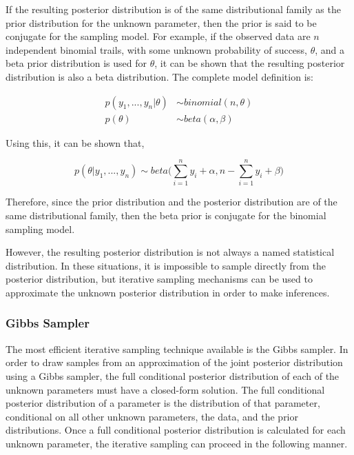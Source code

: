 \documentclass[12pt]{article}\usepackage[]{graphicx}\usepackage[]{color}
\begin{document}
\noindent If the resulting posterior distribution is of the same distributional family as the prior distribution for the unknown parameter, then the prior is said to be conjugate for the sampling model. For example, if the observed data are $n$ independent binomial trails, with some unknown probability of success, $\theta$, and a beta prior distribution is used for $\theta$, it can be shown that the resulting posterior distribution is also a beta distribution. The complete model definition is: 

$$
\begin{aligned}
p(y_1, ..., y_n|\theta) &\sim binomial(n, \theta)\\
p(\theta) &\sim beta(\alpha, \beta)
\end{aligned}
$$

\noindent Using this, it can be shown that, 

$$p(\theta|y_1, ..., y_n) \sim beta \bigg( \sum_{i = 1}^n y_i + \alpha, n - \sum_{i = 1}^n y_i + \beta \bigg)$$

\noindent Therefore, since the prior distribution and the posterior distribution are of the same distributional family, then the beta prior is conjugate for the binomial sampling model.

However, the resulting posterior distribution is not always a named statistical distribution. In these situations, it is impossible to sample directly from the posterior distribution, but iterative sampling mechanisms can be used to approximate the unknown posterior distribution in order to make inferences. 

\subsubsection{Gibbs Sampler}

The most efficient iterative sampling technique available is the Gibbs sampler. In order to draw samples from an approximation of the joint posterior distribution using a Gibbs sampler, the full conditional posterior distribution of each of the unknown parameters must have a closed-form solution. The full conditional posterior distribution of a parameter is the distribution of that parameter, conditional on all other unknown parameters, the data, and the prior distributions. Once a full conditional posterior distribution is calculated for each unknown parameter, the iterative sampling can proceed in the following manner. 
\end{document}
